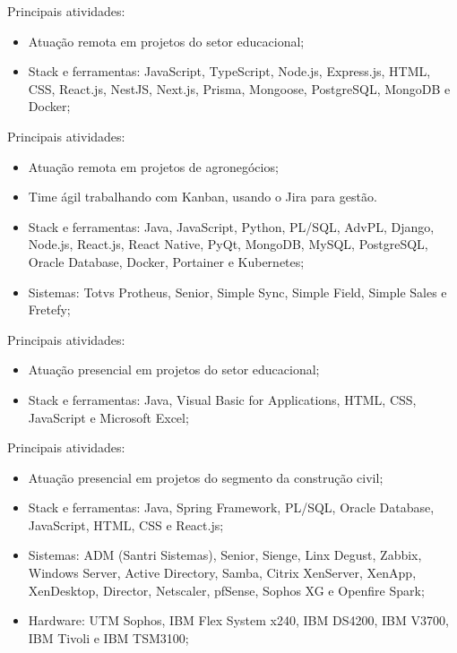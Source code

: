 \documentclass[10pt,a4paper,ragged2e,withhyper]{assets/class/altacv}
\begin{document}
\begin{paracol}{2}
  \divider

  Principais atividades:
  \begin{itemize}
    \item Atuação remota em projetos do setor educacional;
    \item Stack e ferramentas: JavaScript, TypeScript, Node.js, Express.js, HTML, CSS, React.js, NestJS, Next.js, Prisma, Mongoose, PostgreSQL, MongoDB e Docker;
  \end{itemize}

  Principais atividades:
  \begin{itemize}
    \item Atuação remota em projetos de agronegócios;
    \item Time ágil trabalhando com Kanban, usando o Jira para gestão.
    \item Stack e ferramentas: Java, JavaScript, Python, PL/SQL, AdvPL, Django, Node.js, React.js, React Native, PyQt, MongoDB, MySQL, PostgreSQL, Oracle Database, Docker, Portainer e Kubernetes;
    \item Sistemas: Totvs Protheus, Senior, Simple Sync, Simple Field, Simple Sales e Fretefy;
  \end{itemize}

  \divider

  Principais atividades:
  \begin{itemize}
    \item Atuação presencial em projetos do setor educacional;
    \item Stack e ferramentas: Java, Visual Basic for Applications, HTML, CSS, JavaScript e Microsoft Excel;
  \end{itemize}

  \divider

  Principais atividades:
  \begin{itemize}
    \item Atuação presencial em projetos do segmento da construção civil;
    \item Stack e ferramentas: Java, Spring Framework, PL/SQL, Oracle Database, JavaScript, HTML, CSS e React.js;
    \item Sistemas: ADM (Santri Sistemas), Senior, Sienge, Linx Degust, Zabbix, Windows Server, Active Directory, Samba, Citrix XenServer, XenApp, XenDesktop, Director, Netscaler, pfSense, Sophos XG e Openfire Spark;
    \item Hardware: UTM Sophos, IBM Flex System x240, IBM DS4200, IBM V3700, IBM Tivoli e IBM TSM3100;
  \end{itemize}


\end{paracol}
\end{document}
